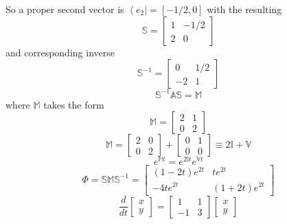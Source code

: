 \documentclass[10pt]{article}
\begin{document}
So a proper second vector is $\left<e_2\right| = \left[-1/2,0\right]$ with the resulting 
\[
  \mathbb{S}      = \left[ \begin{array}{cc}1 & -1/2 \\ 2 & 0 \end{array} \right]
\]
and corresponding inverse
\[
  \mathbb{S}^{-1} = \left[ \begin{array}{cc}0 & 1/2 \\ -2 & 1 \end{array} \right]
\]
\[
  {\mathbb S}^{-1} {\mathbb A} {\mathbb S} = {\mathbb M}
\]
where ${\mathbb M}$ takes the form
\[
  \mathbb{M} = \left[ \begin{array}{cc} 2 & 1 \\ 0 & 2 \end{array} \right]
\]
\[
  \mathbb{M}  =       
         \left[ \begin{array}{cc} 2 & 0 \\ 0 & 2 \end{array} \right] 
       + \left[ \begin{array}{cc} 0 & 1 \\ 0 & 0 \end{array} \right]
     \equiv   
         2 \mathbb{I} + \mathbb{V}   
\]
\[
  e^{\mathbb{M}t} = e^{2\mathbb{I}t} e^{\mathbb{V}t} 
\]
\[
  \Phi = \mathbb{S} \mathbb{M} \mathbb{S}^{-1} 
       = \left[ \begin{array}{cc} (1-2t) e^{2t} & t e^{2t} \\ -4 t e^{2 t} & (1+2t) e^{2t} \end{array} \right]
\]
\[
   \frac{d}{dt} \left[ \begin{array}{c}x \\ y \end{array} \right]
     = \left[ \begin{array}{cc}
                             1  & 1 \\
                             -1 & 3 
                       \end{array} \right]
      \left[ \begin{array}{c}x \\ y \end{array} \right]
\]
\end{document}
